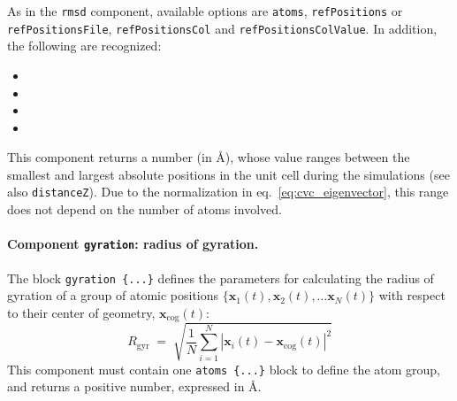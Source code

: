 As in the \texttt{rmsd} component, available options are
\texttt{atoms}, \texttt{refPositions} or \texttt{refPositionsFile},
\texttt{refPositionsCol} and \texttt{refPositionsColValue}.  In
addition, the following are recognized:
\begin{itemize}

\item %

\item %

\item %

\item %

\end{itemize}
This component returns a number (in \AA), whose value ranges between
the smallest and largest absolute positions in the unit cell during
the simulations (see also \texttt{distanceZ}).  Due to the
normalization in eq.~\ref{eq:cvc_eigenvector}, this range does not
depend on the number of atoms involved.


\paragraph*{Component \texttt{gyration}: radius of gyration.}  The
block \texttt{gyration~\{...\}} defines the parameters for
calculating the radius of gyration of a group of atomic positions $\{
\mathbf{x}_1(t), \mathbf{x}_2(t), \ldots \mathbf{x}_N(t) \}$ with
respect to their center of geometry, $\mathbf{x}_{\mathrm{cog}}(t)$:
\begin{equation}
  \label{eq:colvar_gyration}
  R_{\mathrm{gyr}} \; = \; \sqrt{ \frac{1}{N}
    \sum_{i=1}^{N} \left|\mathbf{x}_{i}(t) -
      \mathbf{x}_{\mathrm{cog}}(t)\right|^{2} }
\end{equation}
This component must contain one \texttt{atoms~\{...\}} block to
define the atom group, and returns a positive number, expressed in
\AA{}.


